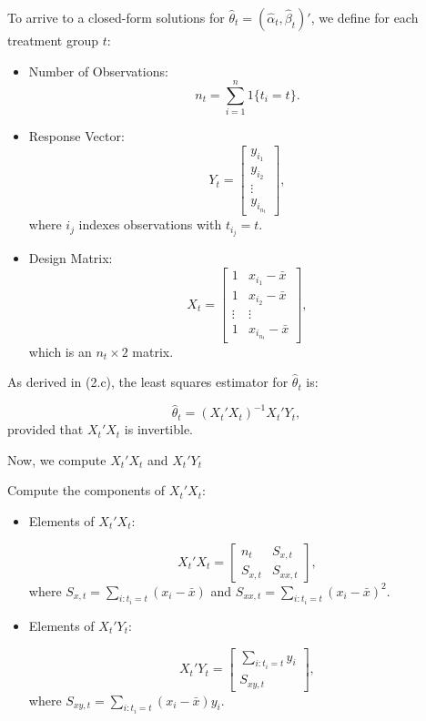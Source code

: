 \documentclass{article}
\begin{document}
To arrive to a closed-form solutions for \(\hat{\theta}_t = (\hat{\alpha}_t, \hat{\beta}_t)'\), we define for each treatment group \(t\):

\begin{itemize}
    \item Number of Observations:
    \[
    n_t = \sum_{i=1}^{n} 1\{t_i = t\}.
    \]

    \item Response Vector:
    \[
    Y_t = \begin{bmatrix} y_{i_1} \\ y_{i_2} \\ \vdots \\ y_{i_{n_t}} \end{bmatrix},
    \]
    where \(i_j\) indexes observations with \(t_{i_j} = t\).

    \item Design Matrix:
    \[
    X_t = \begin{bmatrix} 1 & x_{i_1} - \bar{x} \\ 1 & x_{i_2} - \bar{x} \\ \vdots & \vdots \\ 1 & x_{i_{n_t}} - \bar{x} \end{bmatrix},
    \]
    which is an \(n_t \times 2\) matrix.
\end{itemize}

As derived in (2.c), the least squares estimator for \(\hat{\theta}_t\) is:

\[
\hat{\theta}_t = (X_t' X_t)^{-1} X_t' Y_t,
\]
provided that \(X_t' X_t\) is invertible.

Now, we compute \(X_t' X_t\) and \(X_t' Y_t\)

Compute the components of \(X_t' X_t\):

\begin{itemize}
    \item Elements of \(X_t' X_t\):

    \[
    X_t' X_t = \begin{bmatrix}
    n_t & S_{x,t} \\
    S_{x,t} & S_{xx,t}
    \end{bmatrix},
    \]
    where \(S_{x,t} = \sum_{i: t_i = t} (x_i - \bar{x})\) and \(S_{xx,t} = \sum_{i: t_i = t} (x_i - \bar{x})^2\).

    \item Elements of \(X_t' Y_t\):

    \[
    X_t' Y_t = \begin{bmatrix}
    \sum_{i: t_i = t} y_i \\
    S_{xy,t}
    \end{bmatrix},
    \]
    where \(S_{xy,t} = \sum_{i: t_i = t} (x_i - \bar{x}) y_i.\)
\end{itemize}
\end{document}
